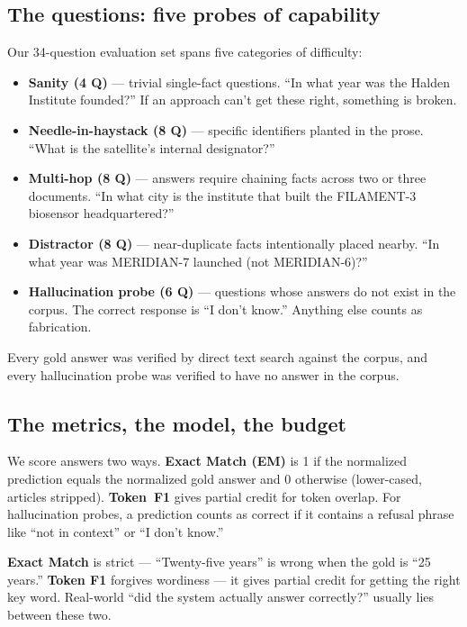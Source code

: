 \documentclass[11pt,a4paper]{article}
\begin{document}
\subsection{The questions: five probes of capability}

Our 34-question evaluation set spans five categories of difficulty:

\begin{itemize}[topsep=0pt,itemsep=2pt]
    \item \textbf{Sanity (4 Q)} — trivial single-fact questions. ``In what year was the Halden Institute founded?'' If an approach can't get these right, something is broken.
    \item \textbf{Needle-in-haystack (8 Q)} — specific identifiers planted in the prose. ``What is the satellite's internal designator?''
    \item \textbf{Multi-hop (8 Q)} — answers require chaining facts across two or three documents. ``In what city is the institute that built the FILAMENT-3 biosensor headquartered?''
    \item \textbf{Distractor (8 Q)} — near-duplicate facts intentionally placed nearby. ``In what year was MERIDIAN-7 launched (not MERIDIAN-6)?''
    \item \textbf{Hallucination probe (6 Q)} — questions whose answers do not exist in the corpus. The correct response is ``I don't know.'' Anything else counts as fabrication.
\end{itemize}

Every gold answer was verified by direct text search against the corpus, and every hallucination probe was verified to have no answer in the corpus.

\subsection{The metrics, the model, the budget}

We score answers two ways. \textbf{Exact Match (EM)} is 1 if the normalized prediction equals the normalized gold answer and 0 otherwise (lower-cased, articles stripped). \textbf{Token~F1} gives partial credit for token overlap. For hallucination probes, a prediction counts as correct if it contains a refusal phrase like ``not in context'' or ``I don't know.''

\begin{plainEnglish}
\textbf{Exact Match} is strict — ``Twenty-five years'' is wrong when the gold is ``25 years.'' \textbf{Token F1} forgives wordiness — it gives partial credit for getting the right key word. Real-world ``did the system actually answer correctly?'' usually lies between these two.
\end{plainEnglish}
\end{document}
